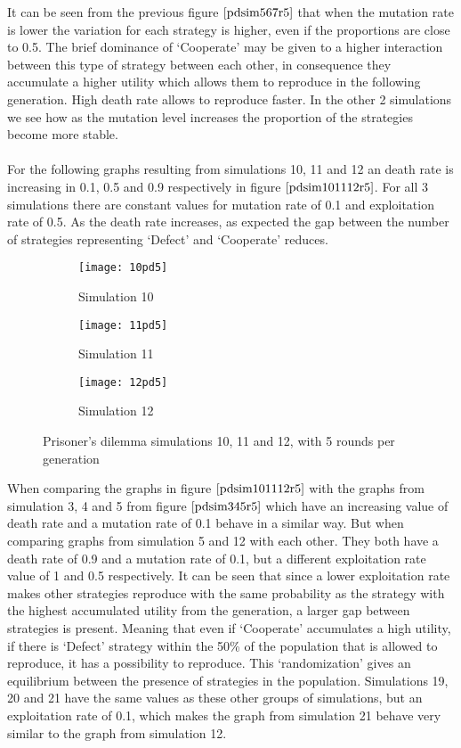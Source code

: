 It can be seen from the previous figure $\ref{pdsim567r5}$ that when the mutation rate is lower the variation for each strategy is higher, even if the proportions are close to 0.5. The brief dominance of `Cooperate' may be given to a higher interaction between this type of strategy between each other, in consequence they accumulate a higher utility which allows them to reproduce in the following generation. High death rate allows to  reproduce faster.  In the other 2 simulations we see how as the mutation level increases the proportion of the strategies become more stable. 
\\\\For the following graphs resulting from simulations 10, 11 and 12 an death rate is increasing in 0.1, 0.5 and 0.9 respectively in figure $\ref{pdsim101112r5}$. For all 3 simulations there are constant values for mutation rate of 0.1 and exploitation rate of 0.5. As the death rate increases, as expected the gap between the number of strategies representing `Defect' and `Cooperate' reduces. 
\begin{figure}[H]       
    \centering
    \begin{subfigure}[b]{0.3\textwidth}
	\centering
	{\texttt{[image: 10pd5]}}   
    	\caption{Simulation 10}
	\label{fig:pds10}
    \end{subfigure}
    \hfill
    \begin{subfigure}[b]{0.3\textwidth}
	\centering
	{\texttt{[image: 11pd5]}}   
    	\caption{Simulation 11}
	\label{fig:pds11}
    \end{subfigure}
    \hfill
    \begin{subfigure}[b]{0.3\textwidth}
	\centering
	{\texttt{[image: 12pd5]}}   
    	\caption{Simulation 12}
	\label{fig:pds12}
    \end{subfigure}
    \caption{Prisoner's dilemma simulations 10, 11 and 12, with 5 rounds per generation}
    \label{pdsim101112r5}
\end{figure}

When comparing the graphs in figure $\ref{pdsim101112r5}$ with the graphs from simulation 3, 4 and 5 from figure $\ref{pdsim345r5}$ which have an increasing value of death rate and a mutation rate of 0.1 behave in a similar way. But when comparing graphs from simulation 5 and 12 with each other. They both have a death rate of 0.9 and a mutation rate of 0.1, but a different exploitation rate value of 1 and 0.5 respectively. It can be seen that since a lower exploitation rate makes other strategies reproduce with the same probability as the strategy with the highest accumulated utility from the generation, a larger gap between strategies is present. Meaning that even if `Cooperate' accumulates a high utility, if there is `Defect' strategy within the 50\% of the population that is allowed to reproduce, it has a possibility to reproduce. This `randomization' gives an equilibrium between the presence of strategies in the population. Simulations 19, 20 and 21 have the same values as these other groups of simulations, but an exploitation rate of 0.1, which makes the graph from simulation 21 behave very similar to the graph from simulation 12. 

